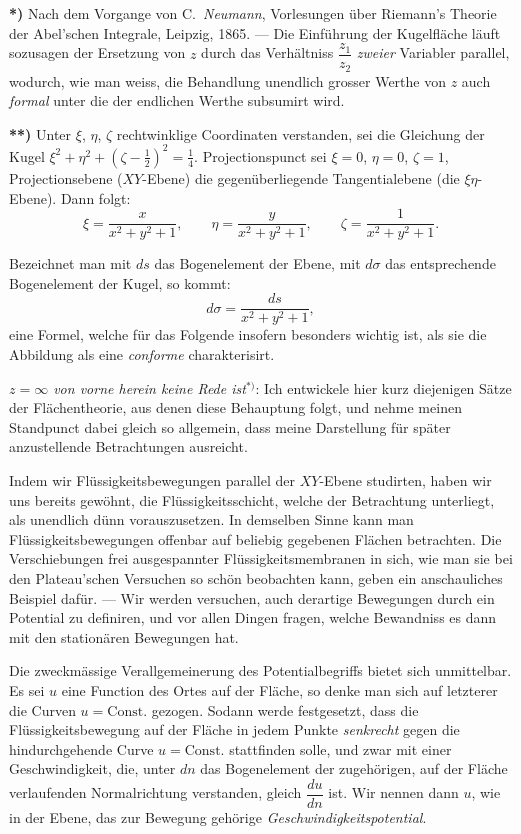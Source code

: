 \documentclass{article}
\begin{document}
\textbf{*)} Nach dem Vorgange von C.\ \emph{Neumann}, Vorlesungen über Riemann's Theorie der Abel'schen Integrale, Leipzig, 1865. --- Die Einführung der Kugelfläche läuft sozusagen der Ersetzung von $z$ durch das Verhältniss $\dfrac{z_{1}}{z_{2}}$ \emph{zweier} Variabler parallel, wodurch, wie man weiss, die Behandlung unendlich grosser Werthe von $z$ auch \emph{formal} unter die der endlichen Werthe subsumirt wird.

\textbf{**)} Unter $\xi$, $\eta$, $\zeta$ rechtwinklige Coordinaten verstanden, sei die Gleichung der Kugel $\xi^{2} + \eta^{2} + (\zeta - \frac{1}{2})^{2} = \frac{1}{4}$. Projectionspunct sei $\xi = 0$, $\eta = 0$, $\zeta = 1$, Projectionsebene ($XY$-Ebene) die gegenüberliegende Tangentialebene (die $\xi\eta$-Ebene). Dann folgt:
\[ \xi = \frac{x}{x^{2} + y^{2} + 1}, \qquad \eta = \frac{y}{x^{2} + y^{2} + 1}, \qquad \zeta = \frac{1}{x^{2} + y^{2} + 1}. \]

Bezeichnet man mit $ds$ das Bogenelement der Ebene, mit $d\sigma$ das entsprechende Bogenelement der Kugel, so kommt:
\[ d\sigma = \frac{ds}{x^{2} + y^{2} + 1}, \]
eine Formel, welche für das Folgende insofern besonders wichtig ist, als sie die Abbildung als eine \emph{conforme} charakterisirt.

\emph{$z = \infty$ von vorne herein keine Rede ist}${}^{*)}$: Ich entwickele hier kurz diejenigen Sätze der Flächentheorie, aus denen diese Behauptung folgt, und nehme meinen Standpunct dabei gleich so allgemein, dass meine Darstellung für später anzustellende Betrachtungen ausreicht.

Indem wir Flüssigkeitsbewegungen parallel der $XY$-Ebene studirten, haben wir uns bereits gewöhnt, die Flüssigkeitsschicht, welche der Betrachtung unterliegt, als unendlich dünn vorauszusetzen. In demselben Sinne kann man Flüssigkeitsbewegungen offenbar auf beliebig gegebenen Flächen betrachten. Die Verschiebungen frei ausgespannter Flüssigkeitsmembranen in sich, wie man sie bei den Plateau'schen Versuchen so schön beobachten kann, geben ein anschauliches Beispiel dafür. --- Wir werden versuchen, auch derartige Bewegungen durch ein Potential zu definiren, und vor allen Dingen fragen, welche Bewandniss es dann mit den stationären Bewegungen hat.

Die zweckmässige Verallgemeinerung des Potentialbegriffs bietet sich unmittelbar. Es sei $u$ eine Function des Ortes auf der Fläche, so denke man sich auf letzterer die Curven $u = \text{Const.}$ gezogen. Sodann werde festgesetzt, dass die Flüssigkeitsbewegung auf der Fläche in jedem Punkte \emph{senkrecht} gegen die hindurchgehende Curve $u = \text{Const.}$ stattfinden solle, und zwar mit einer Geschwindigkeit, die, unter $dn$ das Bogenelement der zugehörigen, auf der Fläche verlaufenden Normalrichtung verstanden, gleich $\dfrac{du}{dn}$ ist. Wir nennen dann $u$, wie in der Ebene, das zur Bewegung gehörige \emph{Geschwindigkeitspotential}.
\end{document}
